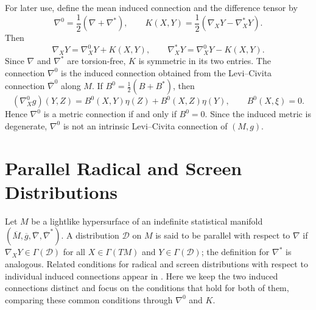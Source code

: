 \documentclass[10pt,a4paper]{amsart}
\begin{document}
For later use, define the mean induced connection and the
difference tensor by
\begin{equation}\label{eq:mean-difference}
\nabla^{0}=\frac{1}{2}\left(\nabla+\nabla^{*}\right),
\qquad
K(X,Y)=\frac{1}{2}\left(\nabla_{X}Y-\nabla^{*}_{X}Y\right).
\end{equation}
Then
\begin{equation}\label{eq:connection-decomposition}
\nabla_{X}Y=\nabla^{0}_{X}Y+K(X,Y),
\qquad
\nabla^{*}_{X}Y=\nabla^{0}_{X}Y-K(X,Y).
\end{equation}
Since $\nabla$ and $\nabla^{*}$ are torsion-free, $K$ is symmetric in its
two entries. The connection $\nabla^{0}$ is the induced connection obtained from the
Levi--Civita connection $\overline{\nabla}^{0}$ along $M$. If
$B^{0}=\frac12(B+B^{*})$, then
\begin{equation}\label{eq:nabla0-g}
(\nabla^{0}_{X}g)(Y,Z)
=
B^{0}(X,Y)\eta(Z)+B^{0}(X,Z)\eta(Y),
\qquad B^{0}(X,\xi)=0.
\end{equation}
Hence $\nabla^{0}$ is a metric connection if and only if $B^{0}=0$.
Since the induced metric is degenerate, $\nabla^{0}$ is not an intrinsic
Levi--Civita connection of $(M,g)$.

\section{Parallel Radical and Screen Distributions}
\label{sec:parallel}

Let $M$ be a lightlike hypersurface of an indefinite statistical manifold
$(\overline{M},\overline{g},\overline{\nabla},
\overline{\nabla}^{*})$. A distribution $\mathcal D$ on $M$ is said to
be parallel with respect to $\nabla$ if
$\nabla_XY\in\Gamma(\mathcal D)$ for all
$X\in\Gamma(TM)$ and $Y\in\Gamma(\mathcal D)$; the definition for
$\nabla^{*}$ is analogous. Related conditions for radical and screen distributions with respect to
individual induced connections appear in
\cite{JainSinghKumar2020,RaniKaur2021,BahadirTripathi2023}. Here we keep
the two induced connections distinct and focus on the conditions that hold for
both of them, comparing these common conditions through $\nabla^{0}$ and $K$.
\end{document}
